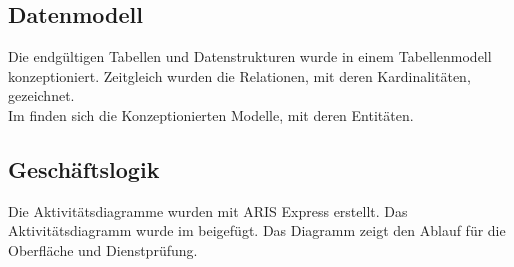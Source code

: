 \subsection{Datenmodell}
\label{sec:Datenmodell}

Die endgültigen Tabellen und Datenstrukturen wurde in einem Tabellenmodell konzeptioniert. Zeitgleich wurden die Relationen, mit deren Kardinalitäten, gezeichnet. \\
Im  finden sich die Konzeptionierten Modelle, mit deren Entitäten.

\subsection{Geschäftslogik}
\label{sec:Geschaeftslogik}

Die Aktivitätsdiagramme wurden mit ARIS Express erstellt. Das Aktivitätsdiagramm  wurde im  beigefügt. Das Diagramm zeigt den Ablauf für die Oberfläche und Dienstprüfung. 


